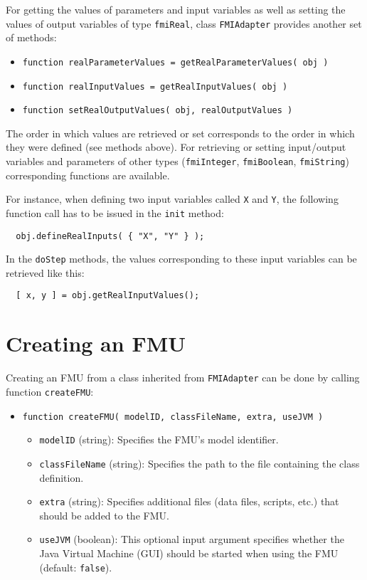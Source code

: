 For getting the values of parameters and input variables as well as setting the values  of output variables of type \texttt{fmiReal}, class \texttt{FMIAdapter} provides another set of methods:
\begin{itemize}
  \item \texttt{function realParameterValues = getRealParameterValues( obj )}
  \item \texttt{function realInputValues = getRealInputValues( obj )}
  \item \texttt{function setRealOutputValues( obj, realOutputValues )}
\end{itemize}
The order in which values are retrieved or set corresponds to the order in which they were defined (see methods above).
For retrieving or setting input/output variables and parameters of other types (\texttt{fmiInteger}, \texttt{fmiBoolean}, \texttt{fmiString}) corresponding functions are available.

For instance, when defining two input variables called \texttt{X} and \texttt{Y}, the following function call has to be issued in the \texttt{init} method:
\begin{verbatim}
  obj.defineRealInputs( { "X", "Y" } );
\end{verbatim}
In the \texttt{doStep} methods, the values corresponding to these input variables can be retrieved like this:
\begin{verbatim}
  [ x, y ] = obj.getRealInputValues();
\end{verbatim}


\section{Creating an FMU}

Creating an FMU from a class inherited from \texttt{FMIAdapter} can be done by calling function \texttt{createFMU}:
\begin{itemize}
  \item \texttt{function createFMU( modelID, classFileName, extra, useJVM )}
  \begin{itemize}
    \item \texttt{modelID} (string): Specifies the FMU's model identifier.
    \item \texttt{classFileName} (string): Specifies the path to the file containing the class definition.
    \item \texttt{extra} (string): Specifies additional files (data files, \matlab scripts, etc.) that should be added to the FMU.
    \item \texttt{useJVM} (boolean): This optional input argument specifies whether the Java Virtual Machine (\matlab GUI) should be started when using the FMU (default: \texttt{false}).
  \end{itemize}
\end{itemize}